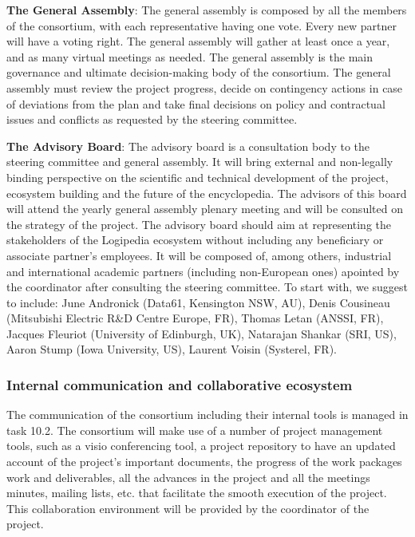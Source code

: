 \begin{compactitem}
\item{\bf The General Assembly}: The general assembly is composed by all
the members of the consortium, with each representative having one
vote. Every new partner will have a voting right. The general assembly
will gather at least once a year, and as many virtual meetings as
needed. The general assembly is the main governance and ultimate
decision-making body of the consortium. The general assembly must
review the project progress, decide on contingency actions in case of
deviations from the plan and take final decisions on policy and
contractual issues and conflicts as requested by the steering
committee.

\item{\bf The Advisory Board}: The advisory board is a consultation body to
the steering committee and general assembly. It will bring external
and non-legally binding perspective on the scientific and technical
development of the project, ecosystem building and the future of the
encyclopedia. The advisors of this board will attend the yearly
general assembly plenary meeting and will be consulted on the strategy
of the project. The advisory board should aim at representing the
stakeholders of the Logipedia ecosystem without including any
beneficiary or associate partner’s employees. It will be composed of,
among others, industrial and international academic partners
(including non-European ones) apointed by the coordinator after
consulting the steering committee. To start with, we suggest to
include: June Andronick (Data61, Kensington NSW, AU), Denis Cousineau
(Mitsubishi Electric R\&D Centre Europe, FR), Thomas Letan (ANSSI, FR),
Jacques Fleuriot (University of Edinburgh, UK), Natarajan Shankar
(SRI, US), Aaron Stump (Iowa University, US), Laurent Voisin
(Systerel, FR).
\end{compactitem}

\subsubsection*{Internal communication and collaborative ecosystem}

The communication of the consortium including their internal tools is
managed in task 10.2.  The consortium will make use of a number of
project management tools, such as a visio conferencing tool, a project
repository to have an updated account of the project’s important
documents, the progress of the work packages work and deliverables,
all the advances in the project and all the meetings minutes, mailing
lists, etc. that facilitate the smooth execution of the project. This
collaboration environment will be provided by the coordinator of the
project.

